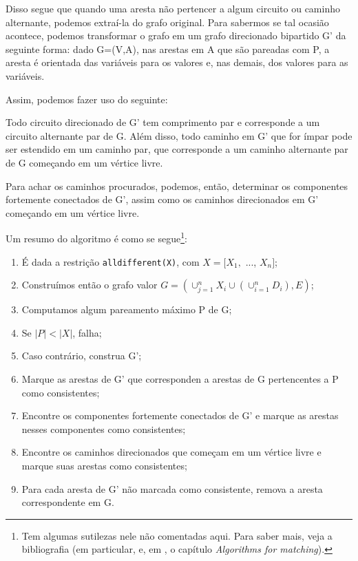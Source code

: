 \documentclass{article}
\begin{document}
Disso segue que quando uma aresta não pertencer a algum circuito ou caminho alternante, podemos extraí-la do grafo original.
Para sabermos se tal ocasião acontece, podemos transformar o grafo em um grafo direcionado bipartido G' da seguinte forma:
dado G=(V,A), nas arestas em A que são pareadas com P, a aresta é orientada das variáveis para os valores e, nas demais, dos valores para as variáveis.

Assim, podemos fazer uso do seguinte:

\begin{theorem}
  Todo circuito direcionado de G' tem comprimento par e corresponde a um circuito alternante par de G. Além disso, todo caminho em G' que for ímpar pode ser estendido em um caminho par, que corresponde a um caminho alternante par de G começando em um vértice livre.
\end{theorem}

Para achar os caminhos procurados, podemos, então, determinar os componentes fortemente conectados de G', assim como os caminhos direcionados em G' começando em um vértice livre.

Um resumo do algoritmo é como se segue\footnote{Tem algumas sutilezas nele não comentadas aqui. Para saber mais, veja a bibliografia (em particular, \cite{basileos} e, em \cite{cristo}, o capítulo \textit{Algorithms for matching}).}:

\begin{enumerate}
  \item É dada a restrição {\tt alldifferent(X)}, com $X = [X_1,$ ..., $X_n]$;
  \item Construímos então o grafo valor $G = (\cup_{j=1}^nX_i\cup(\cup_{i=1}^nD_i),E)$;
  \item Computamos algum pareamento máximo P de G;
  \item Se $|P| < |X|$, falha;
  \item Caso contrário, construa G';
  \item Marque as arestas de G' que corresponden a arestas de G pertencentes a P como consistentes;
  \item Encontre os componentes fortemente conectados de G' e marque as arestas nesses componentes como consistentes;
  \item Encontre os caminhos direcionados que começam em um vértice livre e marque suas arestas como consistentes;
  \item Para cada aresta de G' não marcada como consistente, remova a aresta correspondente em G.
\end{enumerate}
\end{document}
